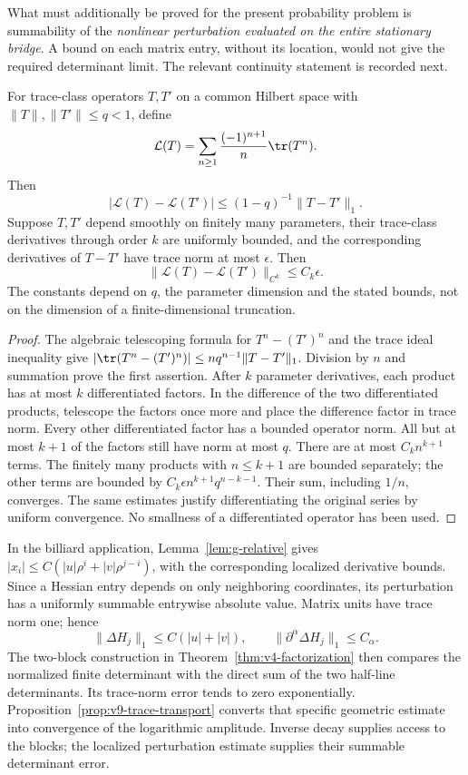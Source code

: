 What must additionally be proved for the present probability problem
is summability of the \emph{nonlinear perturbation evaluated on the
entire stationary bridge}. A bound on each matrix entry, without its
location, would not give the required determinant limit. The relevant
continuity statement is recorded next.

\begin{proposition}
\label{prop:v9-trace-transport}
For trace-class operators $T,T'$ on a common Hilbert space with
$\|T\|,\|T'\|\le q<1$, define
\[
 \mathcal L(T)=\sum_{n\ge1}\frac{(-1)^{n+1}}n\tr(T^n).
\]
Then
\begin{equation}\label{eq:v9-trace-transport}
 |\mathcal L(T)-\mathcal L(T')|
                  \le (1-q)^{-1}\|T-T'\|_1.
\end{equation}
Suppose $T,T'$ depend smoothly on finitely many parameters, their
trace-class derivatives through order $k$ are uniformly bounded,
and the corresponding derivatives of $T-T'$ have trace norm at most
$\epsilon$. Then
\[
       \|\mathcal L(T)-\mathcal L(T')\|_{C^k}\le C_k\epsilon.
\]
The constants depend on $q$, the parameter dimension and the stated
bounds, not on the dimension of a finite-dimensional truncation.
\end{proposition}
\begin{proof}
The algebraic telescoping formula for $T^n-(T')^n$ and the trace ideal
inequality give
$|\tr(T^n-(T')^n)|\le n q^{n-1}\|T-T'\|_1$.
Division by $n$ and summation prove the first assertion.
After $k$ parameter derivatives, each product has at most $k$
differentiated factors. In the difference of the two differentiated
products, telescope the factors once more and place the difference
factor in trace norm. Every other differentiated factor has a bounded
operator norm. All but at most $k+1$ of the factors still have norm
at most $q$. There are at most $C_k n^{k+1}$ terms. The finitely many
products with $n\le k+1$ are bounded separately; the other terms are
bounded by $C_k\epsilon n^{k+1}q^{n-k-1}$. Their sum, including
$1/n$, converges. The same estimates justify differentiating the
original series by uniform convergence. No smallness of a
differentiated operator has been used.
\end{proof}

In the billiard application, Lemma~\ref{lem:g-relative} gives
$|x_i|\le C(|u|\rho^i+|v|\rho^{j-i})$, with the corresponding
localized derivative bounds. Since a Hessian entry depends on only
neighboring coordinates, its perturbation has a uniformly summable
entrywise absolute value. Matrix units have trace norm one; hence
\[
 \|\Delta H_j\|_1\le C(|u|+|v|),\qquad
 \|\partial^\alpha\Delta H_j\|_1\le C_\alpha.
\]
The two-block construction in Theorem~\ref{thm:v4-factorization}
then compares the normalized finite determinant with the direct sum
of the two half-line determinants. Its trace-norm error tends to zero
exponentially. Proposition~\ref{prop:v9-trace-transport} converts that
specific geometric estimate into convergence of the logarithmic
amplitude. Inverse decay supplies access to the blocks; the localized
perturbation estimate supplies their summable determinant error.

